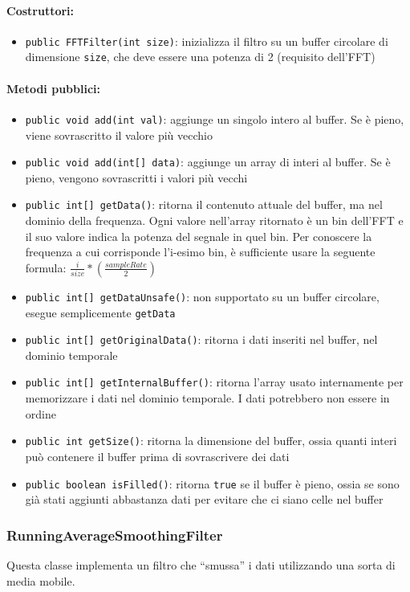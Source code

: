 \paragraph{Costruttori:}\begin{itemize}
	\item \texttt{public FFTFilter(int size)}: inizializza il filtro su un buffer circolare di dimensione \texttt{size}, che deve essere una potenza di 2 (requisito dell'FFT)
\end{itemize}

\paragraph{Metodi pubblici:} \begin{itemize}
	\item \texttt{public void add(int val)}: aggiunge un singolo intero al buffer. Se è pieno, viene sovrascritto il valore più vecchio
	\item \texttt{public void add(int[] data)}: aggiunge un array di interi al buffer. Se è pieno, vengono sovrascritti i valori più vecchi
	\item \texttt{public int[] getData()}: ritorna il contenuto attuale del buffer, ma nel dominio della frequenza. Ogni valore nell'array ritornato è un bin dell'FFT e il suo valore indica la potenza del segnale in quel bin. Per conoscere la frequenza a cui corrisponde l'i-esimo bin, è sufficiente usare la seguente formula: $\frac{i}{size}*(\frac{sampleRate}{2})$
	\item \texttt{public int[] getDataUnsafe()}: non supportato su un buffer circolare, esegue semplicemente \texttt{getData}
	\item \texttt{public int[] getOriginalData()}: ritorna i dati inseriti nel buffer, nel dominio temporale
	\item \texttt{public int[] getInternalBuffer()}: ritorna l'array usato internamente per memorizzare i dati nel dominio temporale. I dati potrebbero non essere in ordine
	\item \texttt{public int getSize()}: ritorna la dimensione del buffer, ossia quanti interi può contenere il buffer prima di sovrascrivere dei dati
	\item \texttt{public boolean isFilled()}: ritorna \texttt{true} se il buffer è pieno, ossia se sono già stati aggiunti abbastanza dati per evitare che ci siano celle nel buffer
\end{itemize}

\subsubsection{RunningAverageSmoothingFilter}
Questa classe implementa un filtro che ``smussa'' i dati utilizzando una sorta di media mobile.

